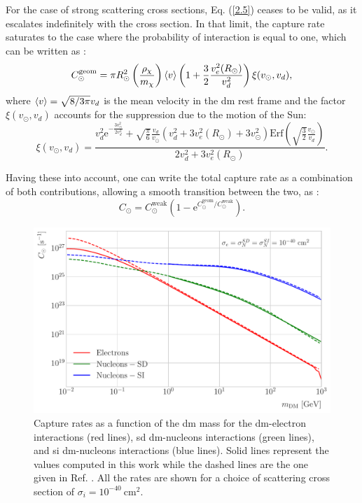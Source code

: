 For the case of strong scattering cross sections, Eq. (\ref{2.5}) ceases to be valid, as it escalates indefinitely with the cross section. In that limit, the capture rate saturates to the case where the probability of interaction is equal to one, which can be written as \cite{Gould1987a}:
\begin{equation}\label{2.14}
	C_{\odot}^{\mathrm{geom}} = \pi R_{\odot}^{2} \left(\frac{\rho_{\chi}}{m_{\chi}}\right) \expval{v} \left(1+\frac{3}{2}\frac{v_{e}^{2}(R_{\odot})}{v_{d}^{2}}\right) \xi(v_{\odot}, v_{d}),
\end{equation}
where $\expval{v} = \sqrt{8/3\pi} v_{d}$ is the mean velocity in the \gls{dm} rest frame and the factor $\xi(v_{\odot}, v_{d})$ accounts for the suppression due to the motion of the Sun:
\begin{equation}\label{2.15}
	\xi(v_{\odot}, v_{d}) = \frac{v_{d}^{2}\mathrm{e}^{-\frac{3v_{\odot}^{2}}{2v_{d}^{2}}}+\sqrt{\frac{\pi}{6}}\frac{v_{d}}{v_{\odot}}\left(v_{d}^{2}+3v_{e}^{2}(R_{\odot})+3v_{\odot}^{2}\right)\mathrm{Erf}\left(\sqrt{\frac{3}{2}}\frac{v_{\odot}}{v_{d}}\right)}{2v_{d}^{2}+3v_{e}^{2}(R_{\odot})}.
\end{equation}

Having these into account, one can write the total capture rate as a combination of both contributions, allowing a smooth transition between the two, as \cite{Bernal2012}:
\begin{equation}\label{2.16}
	C_{\odot} = C_{\odot}^{\mathrm{weak}} \left(1-\mathrm{e}^{C_{\odot}^{\mathrm{geom}}/C_{\odot}^{\mathrm{weak}}}\right).
\end{equation}

\begin{figure}[t]
	\centering
	\includegraphics[width=0.9\linewidth]{Images/DM_Analysis/capture_rates.pdf}
	\caption[Capture rates as a function of the \gls{dm} mass for the \gls{dm}-electron interactions, \gls{sd} \gls{dm}-nucleons interactions, and \gls{si} \gls{dm}-nucleons interactions.]{Capture rates as a function of the \gls{dm} mass for the \gls{dm}-electron interactions (red lines), \gls{sd} \gls{dm}-nucleons interactions (green lines), and \gls{si} \gls{dm}-nucleons interactions (blue lines). Solid lines represent the values computed in this work while the dashed lines are the one given in Ref. \cite{Palomares2017}. All the rates are shown for a choice of scattering cross section of $\sigma_{i} = 10^{-40} \ \mathrm{cm}^{2}$.}
	\label{fig:capture_rates}
\end{figure}


